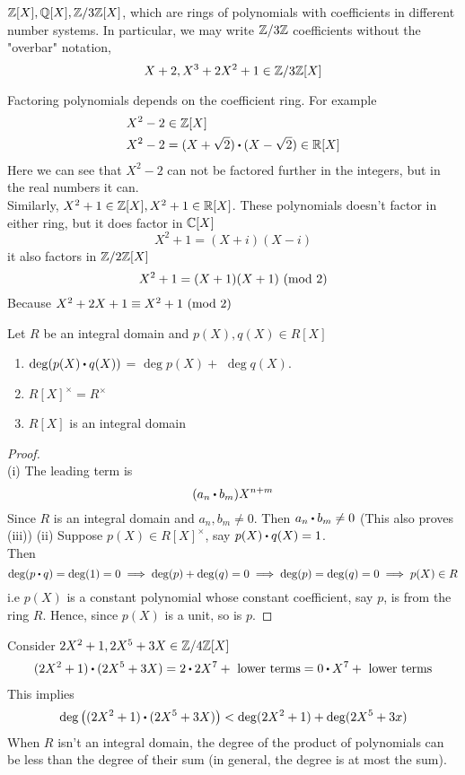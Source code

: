 \documentclass[../Main.tex]{subfiles}
\begin{document}
	\newpage
	\begin{example}
		$\mathbb{Z}[X],\mathbb{Q}[X],\mathbb{Z}/3\mathbb{Z}[X]$, which are rings of polynomials with coefficients in different number systems. In particular, we may write $\mathbb{Z}/3\mathbb{Z}$ coefficients without the "overbar" notation,
		\[X+2, X^3+2X^2+1 \in \mathbb{Z}/3\mathbb{Z}[X]\]
	\end{example}
	Factoring polynomials depends on the coefficient ring. For example
	\begin{align*}
		&X^2-2\in \Z[X] \\
		&X^2-2 = (X+\sqrt{2})\rdot (X-\sqrt{2}) \in \R[X]
	\end{align*}
	Here we can see that $X^2-2$ can not be factored further in the integers, but in the real numbers it can.\\
	Similarly, $X^2+1\in\mathbb{Z}[X], X^2+1\in \mathbb{R}[X]$. These polynomials doesn't factor in either ring, but it does factor in $\mathbb{C}[X]$
	\[X ^2+1=(X+i)(X-i)\]
	it also factors in $\mathbb{Z}/2\mathbb{Z}[X]$
	\[X^2+1=(X+1)(X+1) \ (\mathrm{mod}\ 2)\]
	Because $X^2+2X+1\equiv X^2+1 \ (\mathrm{mod}\ 2)$
	\begin{prop}
		Let $R$ be an integral domain and
		$p(X),q(X)\in R[X]$
		\begin{enumerate}
			\item  $\deg(p(X)\rdot q(X))$ = $\deg p(X)+$  $\deg q(X)$.
			\item $R[X]^\times = R^\times$
			\item $R[X]$ is an integral domain
		\end{enumerate}
	\end{prop}
	\begin{proof}~\\
	(i) The leading term is
			\[(a_n\rdot b_m)X^{n+m}\]
			Since $R$ is an integral domain and $a_n,b_m\ne 0$. Then $a_n\rdot b_m\ne 0$ (This also proves (iii))
	(ii) Suppose $p(X) \in R[X]^\times$, say $p(X)\rdot q(X)=1$.\\
			Then \[\deg(p\rdot q) = \deg(1) = 0\implies \deg(p)+\deg(q)=0\implies \deg(p)=\deg(q)=0\implies p(X)\in R\]
		i.e $p(X)$ is a constant polynomial whose constant coefficient, say $p$, is from the ring $R$. Hence, since $p(X)$ is a unit, so is $p$.
	\end{proof}
	\begin{example}
		Consider $2X^2 +1, 2X^5+3X \in \mathbb{Z}/4\mathbb{Z}[X]$
		\begin{align*}
		(2X^2+1)\rdot (2X^5+3X)=2\rdot 2X^7 + \text{ lower terms}
		= 0\rdot X^7 + \text{ lower terms}
		\end{align*}
	This implies
	\[\deg \left((2X^2+1)\rdot (2X^5+3X)\right)<\deg(2X^2+1)+\deg(2X^5+3x) \]
	When $R$ isn't an integral domain, the degree of the product of polynomials can be less than the degree of their sum (in general, the degree is at most the sum).
	\end{example}
\end{document}
